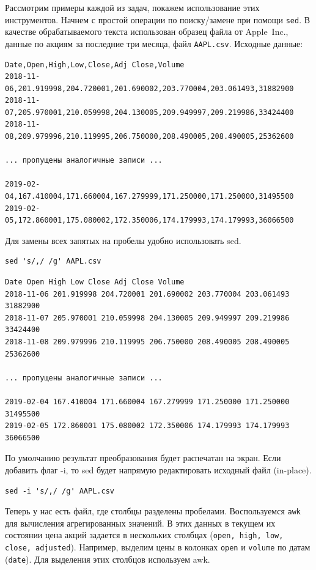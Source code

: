 \documentclass[12pt]{article}
\begin{document}
Рассмотрим примеры каждой из задач, покажем использование этих
инструментов. Начнем с простой операции по поиску/замене при помощи \texttt{sed}.
В качестве обрабатываемого текста использован образец файла от Apple~Inc., данные по акциям за последние три месяца, файл \texttt{AAPL.csv}.
Исходные данные:

\begin{verbatim}
Date,Open,High,Low,Close,Adj Close,Volume
2018-11-06,201.919998,204.720001,201.690002,203.770004,203.061493,31882900
2018-11-07,205.970001,210.059998,204.130005,209.949997,209.219986,33424400
2018-11-08,209.979996,210.119995,206.750000,208.490005,208.490005,25362600

... пропущены аналогичные записи ...

2019-02-04,167.410004,171.660004,167.279999,171.250000,171.250000,31495500
2019-02-05,172.860001,175.080002,172.350006,174.179993,174.179993,36066500
\end{verbatim}

Для замены всех запятых на пробелы удобно использовать sed.

\begin{verbatim}
sed 's/,/ /g' AAPL.csv
\end{verbatim}

\begin{verbatim}
Date Open High Low Close Adj Close Volume
2018-11-06 201.919998 204.720001 201.690002 203.770004 203.061493 31882900
2018-11-07 205.970001 210.059998 204.130005 209.949997 209.219986 33424400
2018-11-08 209.979996 210.119995 206.750000 208.490005 208.490005 25362600

... пропущены аналогичные записи ...

2019-02-04 167.410004 171.660004 167.279999 171.250000 171.250000 31495500
2019-02-05 172.860001 175.080002 172.350006 174.179993 174.179993 36066500
\end{verbatim}

По умолчанию результат преобразования будет распечатан на экран. Если добавить флаг -i,
то sed будет напрямую редактировать исходный файл (in-place).

\begin{verbatim}
sed -i 's/,/ /g' AAPL.csv
\end{verbatim}

Теперь у нас есть файл, где столбцы разделены пробелами. Воспользуемся
\texttt{awk} для вычисления агрегированных значений.
В этих данных в текущем их состоянии цена акций задается в нескольких
столбцах (\texttt{open, high, low, close, adjusted}).
Например, выделим цены в колонках \texttt{open} и \texttt{volume} по датам (\texttt{date}). Для
выделения этих столбцов используем awk.
\end{document}
